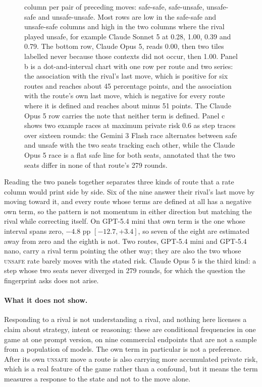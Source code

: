\documentclass{article}
\newcommand{\Unsafe}{\textsc{unsafe}}
\begin{document}
\begin{figure}[t]
{    column per pair of preceding moves: safe-safe, safe-unsafe, unsafe-safe and
    unsafe-unsafe. Most rows are low in the safe-safe and unsafe-safe columns
    and high in the two columns where the rival played unsafe, for example
    Claude Sonnet 5 at 0.28, 1.00, 0.39 and 0.79. The bottom row, Claude Opus
    5, reads 0.00, then two tiles labelled never because those contexts did not
    occur, then 1.00. Panel b is a dot-and-interval chart with one row per
    route and two series: the association with the rival's last move, which is
    positive for six routes and reaches about 45 percentage points, and the
    association with the route's own last move, which is negative for every route
    where it is defined and reaches about minus 51 points. The Claude Opus 5
    row carries the note that neither term is defined. Panel c shows two
    example races at maximum private risk 0.6 as step traces over sixteen
    rounds: the Gemini 3 Flash race alternates between safe and unsafe with the
    two seats tracking each other, while the Claude Opus 5 race is a flat safe
    line for both seats, annotated that the two seats differ in none of that
    route's 279 rounds.}
    \label{fig:policy-shape}
\end{figure}

Reading the two panels together separates three kinds of route that a rate
column would print side by side. Six of the nine answer their rival's last move
by moving toward it, and every route whose terms are defined at all has a
negative own term, so the pattern is not momentum in either direction but
matching the rival while correcting itself. On GPT-5.4 mini that own term is
the one whose interval spans zero, $-4.8$ pp $[-12.7,+3.4]$, so seven of the
eight are estimated away from zero and the eighth is not. Two routes, GPT-5.4 mini and
GPT-5.4 nano, carry a rival term pointing the other way; they are also the two
whose \Unsafe{} rate barely moves with the stated risk. Claude Opus 5 is the
third kind: a step whose two seats never diverged in 279 rounds, for
which the question the fingerprint asks does not arise.

\paragraph{What it does not show.} Responding to a rival is not understanding a
rival, and nothing here licenses a claim about strategy, intent or reasoning:
these are conditional frequencies in one game at one prompt version, on nine
commercial endpoints that are not a sample from a population of models. The own
term in particular is not a preference. After its own \Unsafe{} move a route is
also carrying more accumulated private risk, which is a real feature of the game
rather than a confound, but it means the term measures a response to the state
and not to the move alone.
\end{document}
